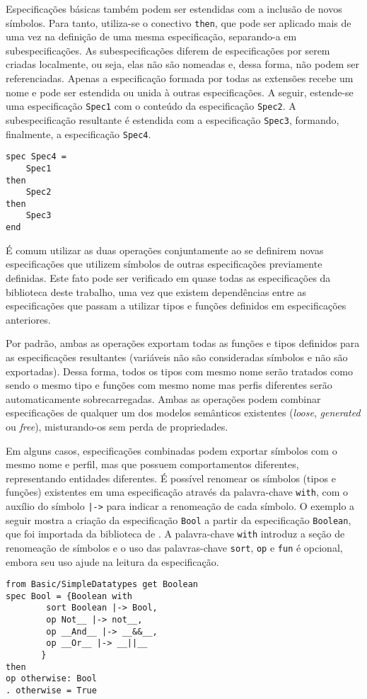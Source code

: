 Especificações básicas também podem ser estendidas com a inclusão de novos símbolos.
Para tanto, utiliza-se o conectivo \Verb.then., que pode ser aplicado mais de uma vez na definição de uma mesma especificação, separando-a em subespecificações.
As subespecificações diferem de especificações por serem criadas localmente, ou seja, elas não são nomeadas e, dessa forma, não podem ser referenciadas.
Apenas a especificação formada por todas as extensões recebe um nome e pode ser estendida ou unida à outras especificações.
A seguir, estende-se uma especificação \Verb.Spec1. com o conteúdo da especificação \Verb.Spec2..
A subespecificação resultante é estendida com a especificação \Verb.Spec3., formando, finalmente, a especificação \Verb.Spec4..
\begin{Verbatim}
spec Spec4 =
    Spec1
then
    Spec2
then
    Spec3
end
\end{Verbatim}

É comum utilizar as duas operações conjuntamente ao se definirem novas especificações que utilizem símbolos de outras especificações previamente definidas.
Este fato pode ser verificado em quase todas as especificações da biblioteca deste trabalho, uma vez que existem dependências entre as especificações que passam a utilizar tipos e funções definidos em especificações anteriores.

Por padrão, ambas as operações exportam todas as funções e tipos definidos para as especificações resultantes (variáveis não são consideradas símbolos e não são exportadas).
Dessa forma, todos os tipos com mesmo nome serão tratados como sendo o mesmo tipo e funções com mesmo nome mas perfis diferentes serão automaticamente sobrecarregadas.
Ambas as operações podem combinar especificações de qualquer um dos modelos semânticos existentes (\textit{loose}, \textit{generated} ou \textit{free}), misturando-os sem perda de propriedades.

Em alguns casos, especificações combinadas podem exportar símbolos com o mesmo nome e perfil, mas que possuem comportamentos diferentes, representando entidades diferentes.
É possível renomear os símbolos (tipos e funções) existentes em uma especificação através da palavra-chave \Verb.with., com o auxílio do símbolo \Verb.|->. para indicar a renomeação de cada símbolo.
O exemplo a seguir mostra a criação da especificação \Verb.Bool. a partir da especificação \Verb.Boolean., que foi importada da biblioteca de \CASL.
A palavra-chave \Verb.with. introduz a seção de renomeação de símbolos e o uso das palavras-chave \Verb.sort., \Verb.op. e \Verb.fun. é opcional, embora seu uso ajude na leitura da especificação.
\begin{Verbatim}
from Basic/SimpleDatatypes get Boolean
spec Bool = {Boolean with 
        sort Boolean |-> Bool,
        op Not__ |-> not__,
        op __And__ |-> __&&__,
        op __Or__ |-> __||__
       }
then
op otherwise: Bool
. otherwise = True
\end{Verbatim}

